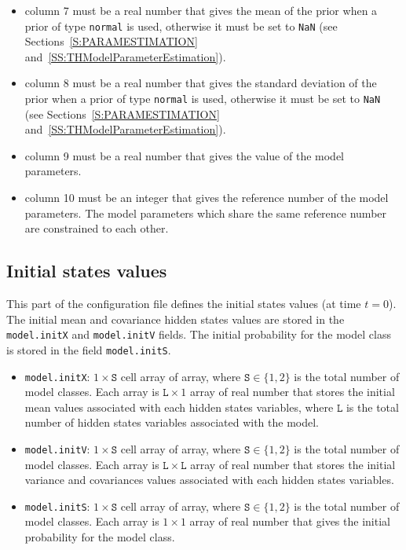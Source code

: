 \begin{itemize}
\item column 7 must be a real number that gives the mean of the prior when a prior of type \lstinline[basicstyle = \mlttfamily \small ]!normal! is used, otherwise it must be set to \lstinline[basicstyle = \mlttfamily \small ]!NaN! (see Sections~\ref{S:PARAMESTIMATION} and~\ref{SS:THModelParameterEstimation}).
\item column 8 must be a real number that gives the standard deviation of the prior when a prior of type \lstinline[basicstyle = \mlttfamily \small ]!normal! is used, otherwise it must be set to \lstinline[basicstyle = \mlttfamily \small ]!NaN! (see Sections~\ref{S:PARAMESTIMATION} and~\ref{SS:THModelParameterEstimation}).
\item column 9 must be a real number that gives the value of the model parameters.
\item column 10 must be an integer that gives the reference number of the model parameters. The model parameters which share the same reference number are constrained to each other.
\end{itemize}

\subsection{Initial states values}
\label{SS:InitialHS}
This part of the configuration file defines the initial states values (at time $t=0$).
The initial mean and covariance hidden states values are stored in the \lstinline[basicstyle = \mlttfamily \small ]!model.initX! and \lstinline[basicstyle = \mlttfamily \small ]!model.initV! fields.
The initial probability for the model class is stored in the field \lstinline[basicstyle = \mlttfamily \small ]!model.initS!.

\begin{itemize}
\item \lstinline[basicstyle = \mlttfamily \small ]!model.initX!: $1\times \mathtt{S}$ cell array of array, where $\mathtt{S} \in \{1, 2 \}$ is the total number of model classes.
Each array is $\mathtt{L}\times1$ array of real number that stores the initial mean values associated with each hidden states variables, where $\mathtt{L}$ is the total number of hidden states variables associated with the model.
\item \lstinline[basicstyle = \mlttfamily \small ]!model.initV!: $1\times \mathtt{S}$ cell array of array, where $\mathtt{S} \in \{1, 2 \}$ is the total number of model classes.
Each array is $\mathtt{L}\times\mathtt{L}$ array of real number that stores the initial variance and covariances values associated with each hidden states variables.
\item \lstinline[basicstyle = \mlttfamily \small ]!model.initS!: $1\times \mathtt{S}$ cell array of array, where $\mathtt{S} \in \{1, 2 \}$ is the total number of model classes. 
Each array is $1\times1$ array of real number that gives the initial probability for the model class.
\end{itemize}

